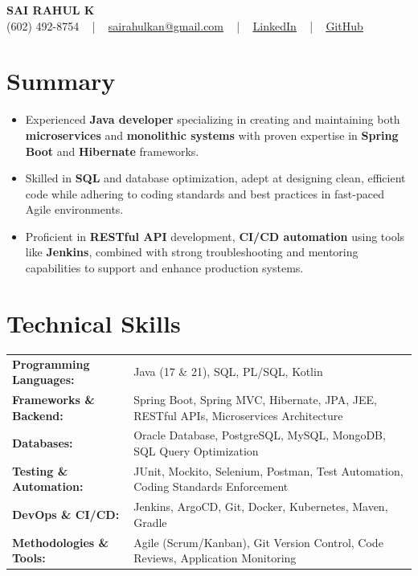 \documentclass[letterpaper,11pt]{article}
\newcommand{\resumeItem}[1]{
  \item\footnotesize{
    {#1 \vspace{-2pt}}
  }
}
\newcommand{\resumeItemListStart}{\begin{itemize}[leftmargin=*]}
\newcommand{\resumeItemListEnd}{\end{itemize}\vspace{-5pt}}
\begin{document}
\begin{center}
    {\fontsize{14pt}{12pt}\selectfont \textbf{\MakeUppercase{Sai Rahul K}}}\\ \vspace{2pt}
    \fontsize{10pt}{12pt}\selectfont (602) 492-8754 ~ | ~ \href{mailto:sairahulkan@gmail.com}{sairahulkan@gmail.com} ~ | ~
    \href{https://www.linkedin.com/in/rq123/}{\color{blue}\underline{LinkedIn}} ~ | ~
    \href{https://github.com/kanrahuldo}{\color{blue}\underline{GitHub}}~
    \vspace{-8pt}
\end{center}

\section{Summary}
\fontsize{9pt}{10pt}\selectfont
\resumeItemListStart
    \resumeItem{Experienced \textbf{Java developer} specializing in creating and maintaining both \textbf{microservices} and \textbf{monolithic systems} with proven expertise in \textbf{Spring Boot} and \textbf{Hibernate} frameworks.}
    \resumeItem{Skilled in \textbf{SQL} and database optimization, adept at designing clean, efficient code while adhering to coding standards and best practices in fast-paced Agile environments.}
    \resumeItem{Proficient in \textbf{RESTful API} development, \textbf{CI/CD automation} using tools like \textbf{Jenkins}, combined with strong troubleshooting and mentoring capabilities to support and enhance production systems.}
\resumeItemListEnd
\vspace{-6pt}

\section{Technical Skills}
        \vspace{-14pt}
        \begin{table}[h]
            \fontsize{9pt}{10pt}\selectfont
            \begin{tabular}{p{0.3\linewidth} p{0.7\linewidth}}
                \textbf{Programming Languages:} & Java (17 \& 21), SQL, PL/SQL, Kotlin \\ 
                \textbf{Frameworks \& Backend:} & Spring Boot, Spring MVC, Hibernate, JPA, JEE, RESTful APIs, Microservices Architecture \\
                \textbf{Databases:} & Oracle Database, PostgreSQL, MySQL, MongoDB, SQL Query Optimization \\
                \textbf{Testing \& Automation:} & JUnit, Mockito, Selenium, Postman, Test Automation, Coding Standards Enforcement \\ 
                \textbf{DevOps \& CI/CD:} & Jenkins, ArgoCD, Git, Docker, Kubernetes, Maven, Gradle \\
                \textbf{Methodologies \& Tools:} & Agile (Scrum/Kanban), Git Version Control, Code Reviews, Application Monitoring \\
            \end{tabular}
        \end{table}
    \vspace{-15pt}
\end{document}
